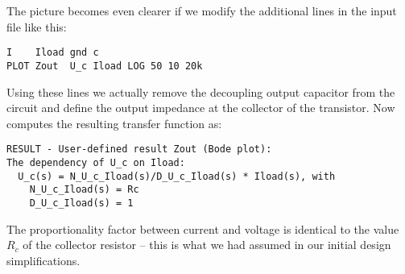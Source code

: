The picture becomes even clearer if we modify the additional lines in the
input file like this:
\begin{verbatim}
I    Iload gnd c
PLOT Zout  U_c Iload LOG 50 10 20k
\end{verbatim}
Using these lines we actually remove the decoupling output capacitor from
the circuit and define the output impedance at the collector of the
transistor. Now \linnet{} computes the resulting transfer function as:
\begin{verbatim}
RESULT - User-defined result Zout (Bode plot):
The dependency of U_c on Iload:
  U_c(s) = N_U_c_Iload(s)/D_U_c_Iload(s) * Iload(s), with
    N_U_c_Iload(s) = Rc
    D_U_c_Iload(s) = 1
\end{verbatim}
The proportionality factor between current and voltage is identical to the
value $R_c$ of the collector resistor -- this is what we had assumed in
our initial design simplifications.
